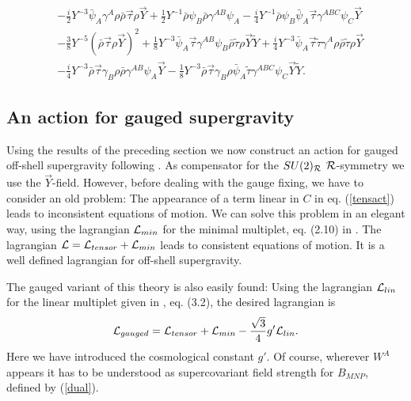 \documentclass[a4paper,12pt, twoside]{article}
\numberwithin{equation}{section}
\begin{document}
\begin{equation}
\begin{split}
& 
-\frac{i}{2}Y^{-3}\bar{\psi}_A\gamma^A\rho\bar{\rho}\vec{\tau}\rho\vec{Y}+\frac{1}{2}Y^{-1}\bar{\rho}\psi_B\bar{\rho}\gamma^{AB}\psi_A-\frac{i}{4}Y^{-1}\bar{\rho}\psi_B\bar{\psi}_A\vec{\tau}\gamma^{ABC}\psi_C\vec{Y}\\
& -\frac{3}{8}Y^{-5}(\bar{\rho}\vec{\tau}\rho\vec{Y})^2 + 
\frac{1}{8}Y^{-3}\bar{\psi}_A\vec{\tau}\gamma^{AB}\psi_B\bar{\rho}\tilde{\tau}\rho\vec{Y}\tilde{Y} 
+ 
\frac{i}{4}Y^{-3}\bar{\psi}_A\vec{\tau}\tilde{\tau}\gamma^A\rho\bar{\rho}\tilde{\tau}\rho\vec{Y}\\
&  
-\frac{i}{4}Y^{-3}\bar{\rho}\vec{\tau}\gamma_B\rho\bar{\rho}\gamma^{AB}\psi_A\vec{Y} - 
\frac{1}{8}Y^{-3}\bar{\rho}\vec{\tau}\gamma_B\rho\bar{\psi}_A\tilde{\tau}\gamma^{ABC}\psi_C\vec{Y}\tilde{Y}.\label{tensact}
\end{split}
\end{equation}
\subsection{An action for gauged supergravity} \label{sugact}
Using the results of the preceding section we now construct an action 
for gauged off-shell supergravity following \cite{deWit:1983na}. As 
compensator for the $SU(2)_{\cal R}$ ${\cal R}$-symmetry we use the 
$\vec{Y}$-field. However, before dealing with the gauge fixing, we have to 
consider an old problem: The appearance of a term linear in $C$ in eq. 
(\ref{tensact}) leads to inconsistent equations of motion. We can solve 
this problem in an elegant way, using the lagrangian ${\cal L}_{min}$ for 
the minimal multiplet, eq. (2.10) in \cite{Zucker:2000ej}. The 
lagrangian ${\cal L}={\cal L}_{tensor}+{\cal L}_{min}$ leads to consistent 
equations of motion. It is a well defined lagrangian for off-shell 
supergravity.

The gauged variant of this theory is also easily found: Using the 
lagrangian ${\cal L}_{lin}$ for the linear multiplet given in 
\cite{Zucker:1999fn}, eq. (3.2), the desired lagrangian is 
\begin{equation}
{\cal L}_{gauged}={\cal L}_{tensor}+{\cal L}_{min}-\frac{\sqrt{3}}{4} 
g'{\cal L}_{lin}.\label{orbi1}
\end{equation}
Here we have introduced the cosmological constant $g'$. Of course, 
wherever $W^A$ appears it has to be understood as supercovariant field 
strength for $B_{MNP}$, defined by (\ref{dual}).
\end{document}
